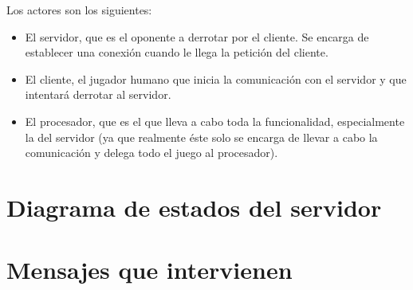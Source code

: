 \documentclass[11pt,a4paper]{article}
\begin{document}
Los actores son los siguientes:\\
	\begin{itemize}
	\item El servidor, que es el oponente a derrotar por el cliente. Se encarga de establecer una conexión cuando le llega la petición del cliente.
	\item El cliente, el jugador humano que inicia la comunicación con el servidor y que intentará derrotar al servidor.
	\item El procesador, que es el que lleva a cabo toda la funcionalidad, especialmente la del servidor (ya que realmente éste solo se encarga de llevar a cabo la comunicación y delega todo el juego al procesador).
	\end{itemize}

\section{Diagrama de estados del servidor}

\begin{figure}[H]
\centering
{}
\end{figure}

\newpage

\section{Mensajes que intervienen}
\end{document}
